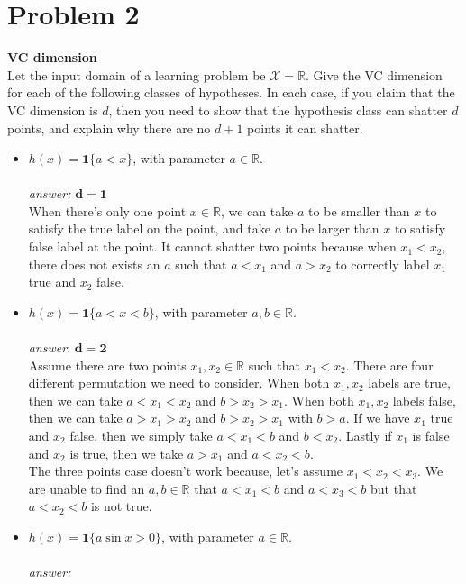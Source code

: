 \documentclass{article}
\begin{document}
\section*{Problem 2}
\textbf{VC dimension}\\
Let the input domain of a learning problem be $\mathcal{X}=\mathbb{R}$. Give the VC dimension for each of the following classes of hypotheses. In each case, if you claim that the VC dimension is $d$, then you need to show that the hypothesis class can shatter $d$ points, and explain why there are no $d+1$ points it can shatter.
\begin{itemize}
    \item $h(x) = \mathbf{1}\{a<x\}$, with parameter $a\in \mathbb{R}$.\\\\
    \textit{answer:}
    $\mathbf{d = 1}$ \\When there's only one point $x\in \mathbb{R}$, we can take $a$ to be smaller than $x$ to satisfy the true label on the point, and take $a$ to be larger than $x$ to satisfy false label at the point. It cannot shatter two points because when $x_1<x_2$, there does not exists an $a$ such that $a<x_1$ and $a>x_2$ to correctly label $x_1$ true and $x_2$ false. 
    \item $h(x) = \mathbf{1}\{a<x<b\}$, with parameter $a,b\in \mathbb{R}$.\\\\
    \textit{answer}:
    $\mathbf{d = 2}$ \\Assume there are two points $x_1, x_2\in \mathbb{R}$ such that $x_1<x_2$. There are four different permutation we need to consider. When both $x_1, x_2$ labels are true, then we can take $a<x_1<x_2$ and $b>x_2>x_1$. When both $x_1, x_2$ labels false, then we can take $a>x_1>x_2$ and $b>x_2>x_1$ with $b>a$. If we have $x_1$ true and $x_2$ false, then we simply take $a<x_1<b$ and $b<x_2$. Lastly if $x_1$ is false and $x_2$ is true, then we take $a>x_1$ and $a<x_2<b$.\\
    The three points case doesn't work because, let's assume $x_1<x_2<x_3$. We are unable to find an $a,b\in \mathbb{R}$ that $a<x_1<b$ and $a<x_3<b$ but that $a<x_2<b$ is not true. 
    \item $h(x) = \mathbf{1}\{a\sin x>0\}$, with parameter $a\in \mathbb{R}$.\\\\
    \textit{answer:}

\end{itemize}
\end{document}
